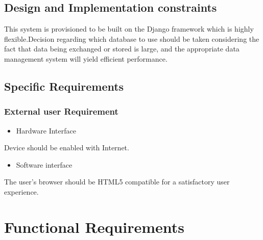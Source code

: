 \documentclass[letterpaper,10pt,english]{sphinxmanual}
\begin{document}
\section{Design and Implementation constraints}
\label{unifieddoc:design-and-implementation-constraints}
This system is provisioned to be built on the Django framework which is highly flexible.Decision regarding which database to use should be taken considering the fact that data being exchanged or stored is large, and the appropriate data management system will yield efficient performance.


\section{Specific Requirements}
\label{unifieddoc:specific-requirements}

\subsection{External user Requirement}
\label{unifieddoc:external-user-requirement}\begin{itemize}
\item {} 
Hardware Interface

\end{itemize}

Device should be enabled with Internet.
\begin{itemize}
\item {} 
Software interface

\end{itemize}

The user's browser should be HTML5 compatible for a satisfactory user experience.


\chapter{Functional Requirements}
\label{unifieddoc:functional-requirements}
\end{document}
